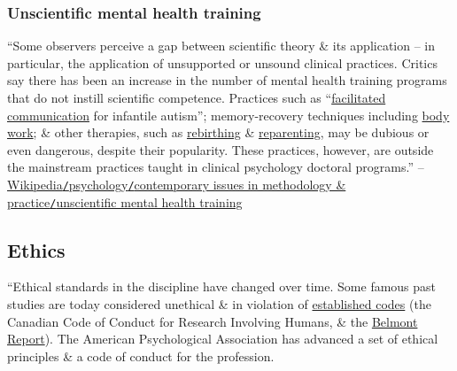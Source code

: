 \documentclass[oneside]{book}
\numberwithin{equation}{section}
\begin{document}
\subsubsection{Unscientific mental health training}
``Some observers perceive a gap between scientific theory \& its application -- in particular, the application of unsupported or unsound clinical practices. Critics say there has been an increase in the number of mental health training programs that do not instill scientific competence. Practices such as ``\href{https://en.wikipedia.org/wiki/Facilitated_communication}{facilitated communication} for infantile autism''; memory-recovery techniques including \href{https://en.wikipedia.org/wiki/Bodywork_(alternative_medicine)}{body work}; \& other therapies, such as \href{https://en.wikipedia.org/wiki/Rebirthing_(breathwork)}{rebirthing} \& \href{https://en.wikipedia.org/wiki/Reparenting}{reparenting}, may be dubious or even dangerous, despite their popularity. These practices, however, are outside the mainstream practices taught in clinical psychology doctoral programs.'' -- \href{https://en.wikipedia.org/wiki/Psychology#Unscientific_mental_health_training}{Wikipedia\texttt{/}psychology\texttt{/}contemporary issues in methodology \& practice\texttt{/}unscientific mental health training}

\subsection{Ethics}
``Ethical standards in the discipline have changed over time. Some famous past studies are today considered unethical \& in violation of \href{https://en.wikipedia.org/wiki/Guidelines_for_human_subject_research#APA_Ethics_Code}{established codes} (the Canadian Code of Conduct for Research Involving Humans, \& the \href{https://en.wikipedia.org/wiki/Belmont_Report}{Belmont Report}). The American Psychological Association has advanced a set of ethical principles \& a code of conduct for the profession.
\end{document}
